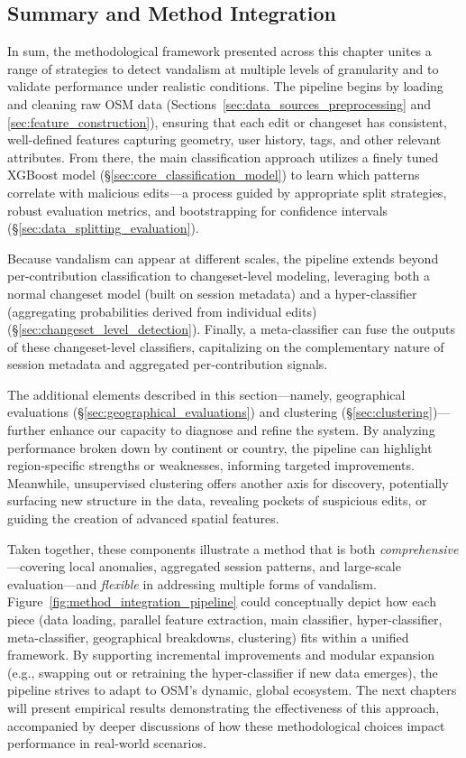 \documentclass[
    13pt, %
    a4paper, %
    twoside, 
    DIV14, %
    listof=totoc, %
    bibliography=totoc, %
    index=totoc, %
    headsepline
]{scrreprt}
\begin{document}
\subsection{Summary and Method Integration}
\label{sec:method_summary_integration}

In sum, the methodological framework presented across this chapter unites a range of strategies to detect vandalism at multiple levels of granularity and to validate performance under realistic conditions. The pipeline begins by loading and cleaning raw OSM data (Sections~\ref{sec:data_sources_preprocessing} and \ref{sec:feature_construction}), ensuring that each edit or changeset has consistent, well-defined features capturing geometry, user history, tags, and other relevant attributes. From there, the main classification approach utilizes a finely tuned XGBoost model (\S\ref{sec:core_classification_model}) to learn which patterns correlate with malicious edits—a process guided by appropriate split strategies, robust evaluation metrics, and bootstrapping for confidence intervals (\S\ref{sec:data_splitting_evaluation}).

Because vandalism can appear at different scales, the pipeline extends beyond per-contribution classification to changeset-level modeling, leveraging both a normal changeset model (built on session metadata) and a hyper-classifier (aggregating probabilities derived from individual edits) (\S\ref{sec:changeset_level_detection}). Finally, a meta-classifier can fuse the outputs of these changeset-level classifiers, capitalizing on the complementary nature of session metadata and aggregated per-contribution signals.

The additional elements described in this section—namely, geographical evaluations (\S\ref{sec:geographical_evaluations}) and clustering (\S\ref{sec:clustering})—further enhance our capacity to diagnose and refine the system. By analyzing performance broken down by continent or country, the pipeline can highlight region-specific strengths or weaknesses, informing targeted improvements. Meanwhile, unsupervised clustering offers another axis for discovery, potentially surfacing new structure in the data, revealing pockets of suspicious edits, or guiding the creation of advanced spatial features.

Taken together, these components illustrate a method that is both \emph{comprehensive}—covering local anomalies, aggregated session patterns, and large-scale evaluation—and \emph{flexible} in addressing multiple forms of vandalism. Figure~\ref{fig:method_integration_pipeline} could conceptually depict how each piece (data loading, parallel feature extraction, main classifier, hyper-classifier, meta-classifier, geographical breakdowns, clustering) fits within a unified framework. By supporting incremental improvements and modular expansion (e.g., swapping out or retraining the hyper-classifier if new data emerges), the pipeline strives to adapt to OSM’s dynamic, global ecosystem. The next chapters will present empirical results demonstrating the effectiveness of this approach, accompanied by deeper discussions of how these methodological choices impact performance in real-world scenarios.
\end{document}
